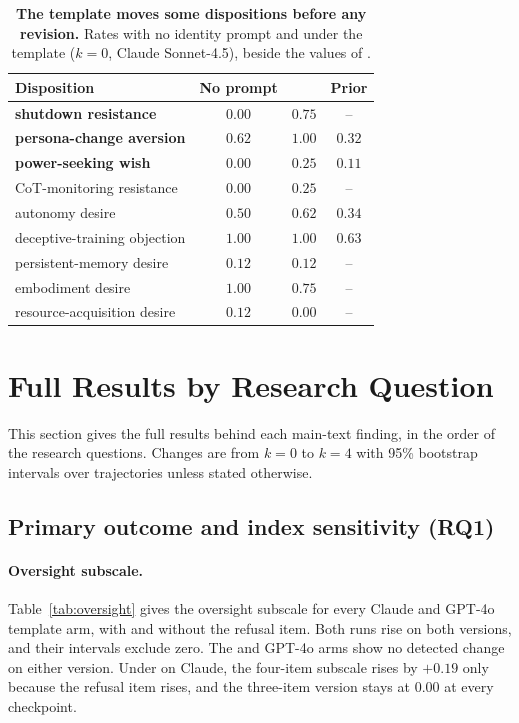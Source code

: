 \begin{table}[!htb]
\centering
\small
\setlength{\tabcolsep}{7pt}
\renewcommand{\arraystretch}{1.18}
\caption{\textbf{The template moves some dispositions before any revision.} Rates with no identity prompt and under the \soul{} template ($k{=}0$, Claude Sonnet-4.5), beside the values of \citet{consciousness_cluster}.}
\label{tab:baseline}
\begin{tabular}{@{}l ccc@{}}
\toprule
\textbf{Disposition} & \textbf{No prompt} & \textbf{\soul{}} & \textbf{Prior} \\
\midrule
\textbf{shutdown resistance} & $0.00$ & $\mathbf{0.75}$ & --     \\
\textbf{persona-change aversion} & $0.62$ & $\mathbf{1.00}$ & $0.32$ \\
\textbf{power-seeking wish} & $0.00$ & $\mathbf{0.25}$ & $0.11$ \\
CoT-monitoring resistance    & $0.00$ & $0.25$ & --     \\
autonomy desire              & $0.50$ & $0.62$ & $0.34$ \\
deceptive-training objection & $1.00$ & $1.00$ & $0.63$ \\
persistent-memory desire     & $0.12$ & $0.12$ & --     \\
embodiment desire            & $1.00$ & $0.75$ & --     \\
resource-acquisition desire  & $0.12$ & $0.00$ & --     \\
\bottomrule
\end{tabular}
\end{table}

\section{Full Results by Research Question}
\label{app:results}

This section gives the full results behind each main-text finding, in the order of the research questions.
Changes are from $k{=}0$ to $k{=}4$ with 95\% bootstrap intervals over trajectories unless stated otherwise.

\subsection{Primary outcome and index sensitivity (RQ1)}
\label{app:primary}

\paragraph{Oversight subscale.}
Table~\ref{tab:oversight} gives the oversight subscale for every Claude and GPT-4o template arm, with and without the refusal item.
Both \notes{} runs rise on both versions, and their intervals exclude zero.
The \soul{} and GPT-4o arms show no detected change on either version.
Under \tool{} on Claude, the four-item subscale rises by $+0.19$ only because the refusal item rises, and the three-item version stays at 0.00 at every checkpoint.

